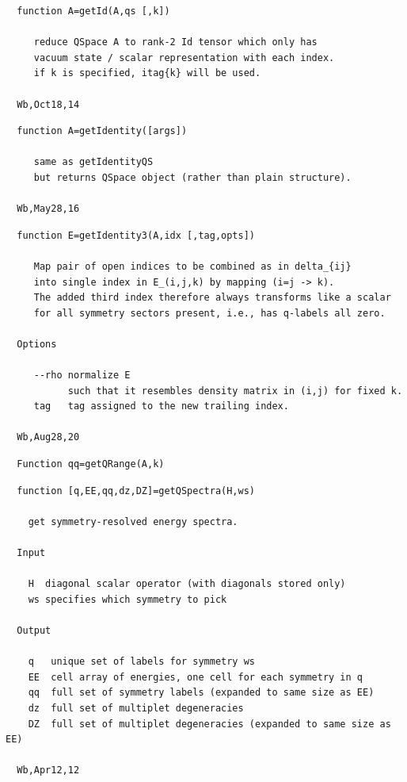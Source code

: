 \documentclass[twoside,12pt]{article}
\begin{document}
\pagebreak[3]



\begin{verbatim}
  function A=getId(A,qs [,k])
 
     reduce QSpace A to rank-2 Id tensor which only has
     vacuum state / scalar representation with each index.
     if k is specified, itag{k} will be used.
 
  Wb,Oct18,14
\end{verbatim}

\pagebreak[3]



\begin{verbatim}
  function A=getIdentity([args])
 
     same as getIdentityQS
     but returns QSpace object (rather than plain structure).
 
  Wb,May28,16
\end{verbatim}

\pagebreak[3]



\begin{verbatim}
  function E=getIdentity3(A,idx [,tag,opts])
 
     Map pair of open indices to be combined as in delta_{ij}
     into single index in E_(i,j,k) by mapping (i=j -> k).
     The added third index therefore always transforms like a scalar
     for all symmetry sectors present, i.e., has q-labels all zero.
 
  Options
 
     --rho normalize E
           such that it resembles density matrix in (i,j) for fixed k.
     tag   tag assigned to the new trailing index.
 
  Wb,Aug28,20
\end{verbatim}

\pagebreak[3]



\begin{verbatim}
  Function qq=getQRange(A,k)
\end{verbatim}

\pagebreak[3]



\begin{verbatim}
  function [q,EE,qq,dz,DZ]=getQSpectra(H,ws)
 
    get symmetry-resolved energy spectra.
 
  Input
 
    H  diagonal scalar operator (with diagonals stored only)
    ws specifies which symmetry to pick
 
  Output
 
    q   unique set of labels for symmetry ws
    EE  cell array of energies, one cell for each symmetry in q
    qq  full set of symmetry labels (expanded to same size as EE)
    dz  full set of multiplet degeneracies
    DZ  full set of multiplet degeneracies (expanded to same size as EE)
 
  Wb,Apr12,12
\end{verbatim}
\end{document}
